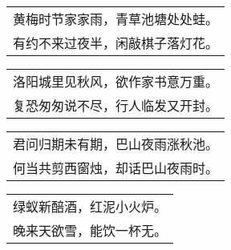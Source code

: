 \noindent\begin{minipage}{\linewidth}
  \vskip-3pt\begin{table}[H]
    \centering
    \begin{tabular}{@{}l@{}}
黄梅时节家家雨，青草池塘处处蛙。\\
有约不来过夜半，闲敲棋子落灯花。
    \end{tabular}
  \end{table}
\end{minipage}
\vspace{1cm}


\noindent\begin{minipage}{\linewidth}
  \vskip-3pt\begin{table}[H]
    \centering
    \begin{tabular}{@{}l@{}}
洛阳城里见秋风，欲作家书意万重。\\
复恐匆匆说不尽，行人临发又开封。
    \end{tabular}
  \end{table}
\end{minipage}
\vspace{1cm}


\noindent\begin{minipage}{\linewidth}
  \vskip-3pt\begin{table}[H]
    \centering
    \begin{tabular}{@{}l@{}}
君问归期未有期，巴山夜雨涨秋池。\\
何当共剪西窗烛，却话巴山夜雨时。
    \end{tabular}
  \end{table}
\end{minipage}
\vspace{1cm}


\noindent\begin{minipage}{\linewidth}
  \vskip-3pt\begin{table}[H]
    \centering
    \begin{tabular}{@{}l@{}}
绿蚁新醅酒，红泥小火炉。\\
晚来天欲雪，能饮一杯无。
    \end{tabular}
  \end{table}
\end{minipage}
\vspace{1cm}


